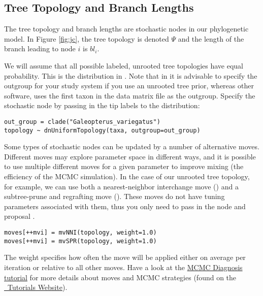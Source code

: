 \bigskip
\subsection{Tree Topology and Branch Lengths}

The tree topology and branch lengths are stochastic nodes in our phylogenetic model. 
In Figure \ref{fig:jc}, the tree topology is denoted $\Psi$ and the length of the branch leading to node $i$ is $bl_i$.

We will assume that all possible labeled, unrooted tree topologies have equal probability. 
This is the  distribution in \RevBayes. 
Note that in \RevBayes it is advisable to specify the outgroup for your study system if you use an unrooted tree prior, whereas other software, \EG \MrBayes uses the first taxon in the data matrix file as the outgroup.
Specify the  stochastic node by passing in the tip labels  to the  distribution:
{\tt \begin{snugshade*}
\begin{lstlisting}
out_group = clade("Galeopterus_variegatus")
topology ~ dnUniformTopology(taxa, outgroup=out_group)
\end{lstlisting}
\end{snugshade*}}

Some types of stochastic nodes can be updated by a number of alternative moves. 
Different moves may explore parameter space in different ways, and it is possible to use multiple different moves for a given parameter to improve mixing (the efficiency of the MCMC simulation). 
In the case of our unrooted tree topology, for example, we can use both a nearest-neighbor interchange move () and a subtree-prune and regrafting move (). 
These moves do not have tuning parameters associated with them, thus you only need to pass in the  node and proposal . 
{\tt \begin{snugshade*}
\begin{lstlisting}
moves[++mvi] = mvNNI(topology, weight=1.0)
moves[++mvi] = mvSPR(topology, weight=1.0)
\end{lstlisting}
\end{snugshade*}}
The weight specifies how often the move will be applied either on average per iteration or relative to all other moves.
Have a look at the \href{https://github.com/revbayes/revbayes_tutorial/raw/master/tutorial_TeX/RB_MCMC_Tutorial/RB_MCMC_Tutorial.pdf}{MCMC Diagnosis tutorial} for more details about moves and MCMC strategies (found on the \href{http://revbayes.github.io/tutorials.html}{\RevBayes~Tutorials Website}).


